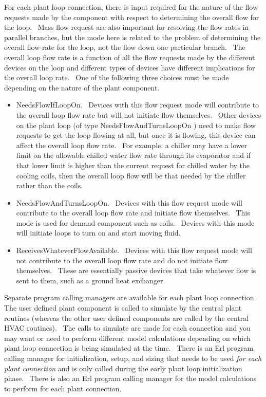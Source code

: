 For each plant loop connection, there is input required for the nature of the flow requests made by the component with respect to determining the overall flow for the loop.~ Mass flow request are also important for resolving the flow rates in parallel branches, but the mode here is related to the problem of determining the overall flow rate for the loop, not the flow down one particular branch.~ The overall loop flow rate is a function of all the flow requests made by the different devices on the loop and different types of devices have different implications for the overall loop rate.~ One of the following three choices must be made depending on the nature of the plant component.

\begin{itemize}
\item
  NeedsFlowIfLoopOn.~ Devices with this flow request mode will contribute to the overall loop flow rate but will not initiate flow themselves.~ Other devices on the plant loop (of type NeedsFlowAndTurnsLoopOn ) need to make flow requests to get the loop flowing at all, but once it is flowing, this device can affect the overall loop flow rate.~ For example, a chiller may have a lower limit on the allowable chilled water flow rate through its evaporator and if that lower limit is higher than the current request for chilled water by the cooling coils, then the overall loop flow will be that needed by the chiller rather than the coils.
\item
  NeedsFlowAndTurnsLoopOn.~ Devices with this flow request mode will contribute to the overall loop flow rate and initiate flow themselves.~ This mode is used for demand component such as coils.~ Devices with this mode will initiate loops to turn on and start moving fluid.
\item
  ReceivesWhateverFlowAvailable.~ Devices with this flow request mode will not contribute to the overall loop flow rate and do not initiate flow themselves.~ These are essentially passive devices that take whatever flow is sent to them, such as a ground heat exchanger.
\end{itemize}

Separate program calling managers are available for each plant loop connection.~ The user defined plant component is called to simulate by the central plant routines (whereas the other user defined components are called by the central HVAC routines).~ The calls to simulate are made for each connection and you may want or need to perform different model calculations depending on which plant loop connection is being simulated at the time.~ There is an Erl program calling manager for initialization, setup, and sizing that needs to be used \emph{for each plant connection} and is only called during the early plant loop initialization phase.~ There is also an Erl program calling manager for the model calculations to perform for each plant connection.

